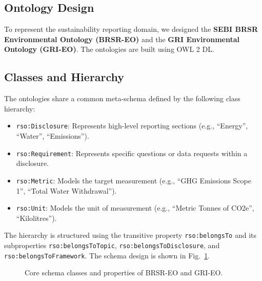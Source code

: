 \documentclass[journal,compsoc]{IEEEtran}
\begin{document}
\begin{itemize}
\begin{table}[t]
\begin{itemize}
\section{Ontology Design}
To represent the sustainability reporting domain, we designed the \textbf{SEBI BRSR Environmental Ontology (BRSR-EO)} and the \textbf{GRI Environmental Ontology (GRI-EO)}. The ontologies are built using OWL 2 DL.

\subsection{Classes and Hierarchy}
The ontologies share a common meta-schema defined by the following class hierarchy:
\begin{itemize}
    \item \texttt{rso:Disclosure}: Represents high-level reporting sections (e.g., ``Energy'', ``Water'', ``Emissions'').
    \item \texttt{rso:Requirement}: Represents specific questions or data requests within a disclosure.
    \item \texttt{rso:Metric}: Models the target measurement (e.g., ``GHG Emissions Scope 1'', ``Total Water Withdrawal'').
    \item \texttt{rso:Unit}: Models the unit of measurement (e.g., ``Metric Tonnes of CO2e'', ``Kilolitres'').
\end{itemize}

The hierarchy is structured using the transitive property \texttt{rso:belongsTo} and its subproperties \texttt{rso:belongsToTopic}, \texttt{rso:belongsToDisclosure}, and \texttt{rso:belongsToFramework}. The schema design is shown in Fig.~\ref{fig:ontology}.

\begin{figure}[h]
\centering
{}
\caption{Core schema classes and properties of BRSR-EO and GRI-EO.}
\label{fig:ontology}
\end{figure}


\end{itemize}
\end{table}
\end{itemize}
\end{document}

